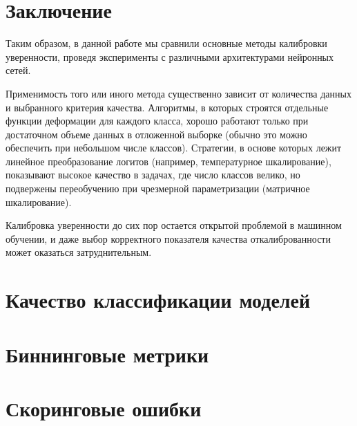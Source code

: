 \documentclass[12pt]{article}
\begin{document}
\section{Заключение}
Таким образом, в данной работе мы сравнили основные методы калибровки уверенности, проведя эксперименты с различными архитектурами нейронных сетей.

Применимость того или иного метода существенно зависит от количества данных и выбранного критерия качества. Алгоритмы, в которых строятся отдельные функции деформации для каждого класса, хорошо работают только при достаточном объеме данных в отложенной выборке (обычно это можно обеспечить при небольшом числе классов). Стратегии, в основе которых лежит линейное преобразование логитов (например, температурное шкалирование), показывают высокое качество в задачах, где число классов велико, но подвержены переобучению при чрезмерной параметризации (матричное шкалирование).

Калибровка уверенности до сих пор остается открытой проблемой в машинном обучении, и даже выбор корректного показателя качества откалиброванности может оказаться затруднительным.

\newpage
\printbibliography[
    heading=bibintoc,
    title={Список литературы}
]

\newpage
\begin{appendices}\label{sec:appendix}
\section{Качество классификации моделей}


\clearpage

\section{Биннинговые метрики}






\clearpage

\section{Скоринговые ошибки}





\end{appendices}
\end{document}
